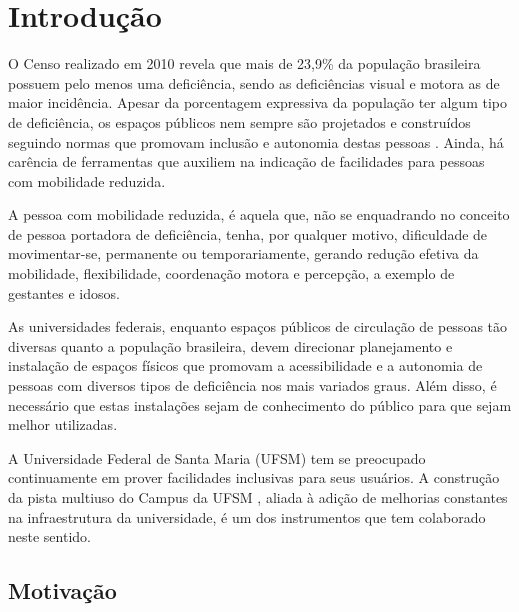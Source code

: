 \documentclass[oneside,openright,12pt]{ufsm_2015} %
\author{Elmo Santos da Silva Neto}   %
\begin{document}
\pretextual




\chapter{Introdução}
\label{sec:introducao}


 O Censo realizado em 2010 \cite{ibge:2019} revela que mais de 23,9\% da população brasileira possuem pelo menos uma deficiência, sendo as deficiências visual e motora as de maior incidência. 
Apesar da porcentagem expressiva da população ter algum tipo de deficiência, os espaços públicos nem sempre são projetados e construídos seguindo normas que promovam inclusão e autonomia destas pessoas \cite{cambruzzi:2013}. 
Ainda, há carência de ferramentas que auxiliem na indicação de facilidades para pessoas com mobilidade reduzida. 

 A pessoa com mobilidade reduzida, é aquela que, não se enquadrando no conceito de pessoa portadora de deficiência, tenha, por qualquer motivo, dificuldade de movimentar-se, permanente ou temporariamente, gerando redução efetiva da mobilidade, flexibilidade, coordenação motora e percepção, a exemplo de gestantes e idosos. \cite{brasil}

As universidades federais, enquanto espaços públicos de circulação de pessoas tão diversas quanto a população brasileira, devem direcionar planejamento e instalação de espaços físicos que promovam a acessibilidade e a autonomia de pessoas com diversos tipos de deficiência nos mais variados graus.  
Além disso, é necessário que estas instalações sejam de conhecimento do público para que sejam melhor utilizadas. 

A Universidade Federal de Santa Maria (UFSM) tem se preocupado continuamente em prover facilidades inclusivas para seus usuários.
A construção da pista multiuso do Campus da UFSM \cite{lauret:2016, oliveira:2020}, aliada à adição de melhorias constantes na infraestrutura da universidade, é um dos instrumentos que tem colaborado neste sentido.


\section{Motivação}
\end{document}
